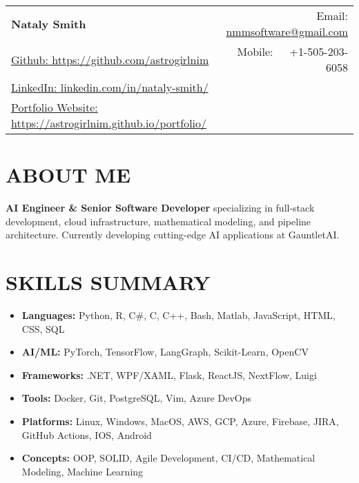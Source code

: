 \documentclass[a4paper,20pt]{article}
\newcommand{\resumeItem}[2]{
  \item\small{
    \textbf{#1}{#2 \vspace{-3pt}}
  }
}
\newcommand{\resumeSubItem}[2]{\resumeItem{#1}{#2}\vspace{-5pt}}
\newcommand{\resumeSubHeadingListStart}{\begin{itemize}[leftmargin=*]}
\newcommand{\resumeSubHeadingListEnd}{\end{itemize}}
\begin{document}
\begin{tabular*}{\textwidth}{l@{\extracolsep{\fill}}r}
  \textbf{{\LARGE Nataly Smith}} & Email: \href{mailto:nmmsoftware@gmail.com}{nmmsoftware@gmail.com}\\
  \href{https://github.com/astrogirlnim}{Github: https://github.com/astrogirlnim} & Mobile:~~~+1-505-203-6058 \\
  \href{https://www.linkedin.com/in/nataly-smith/}{LinkedIn: linkedin.com/in/nataly-smith/} \\
  \href{https://astrogirlnim.github.io/portfolio/}{Portfolio Website: https://astrogirlnim.github.io/portfolio/} \\
\end{tabular*}

\vspace{-5pt}
\section{\textbf{ABOUT ME}}
\textbf{AI Engineer \& Senior Software Developer} specializing in full-stack development, cloud infrastructure, mathematical modeling, and pipeline architecture. Currently developing cutting-edge AI applications at GauntletAI.
\vspace{1pt}
\section{\textbf{SKILLS SUMMARY}}
	\resumeSubHeadingListStart
	\resumeSubItem{Languages:}{ Python, R, C\#, C, C++, Bash, Matlab, JavaScript, HTML, CSS, SQL}
	\resumeSubItem{AI/ML:}{ PyTorch, TensorFlow, LangGraph, Scikit-Learn, OpenCV }
	\resumeSubItem{Frameworks:}{ .NET, WPF/XAML, Flask, ReactJS, NextFlow, Luigi}
	\resumeSubItem{Tools:}{ Docker, Git, PostgreSQL, Vim, Azure DevOps}
	\resumeSubItem{Platforms:}{ Linux, Windows, MacOS, AWS, GCP, Azure, Firebase, JIRA, GitHub Actions, IOS, Android }
    \resumeSubItem{Concepts:}{ OOP, SOLID, Agile Development, CI/CD, Mathematical Modeling, Machine Learning }
\resumeSubHeadingListEnd
\vspace{1pt}
\end{document}
